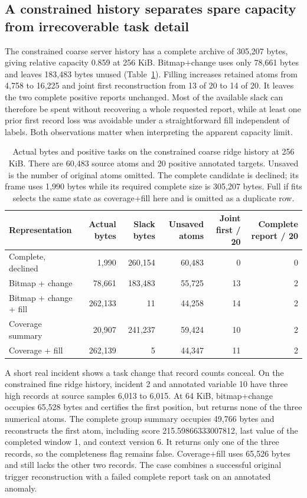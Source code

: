 \documentclass[a4paper,fleqn]{cas-dc}
\begin{document}
\subsection{A constrained history separates spare capacity from irrecoverable task detail}

The constrained coarse server history has a complete archive of 305{,}207 bytes, giving relative capacity 0.859 at 256 KiB. Bitmap+change uses only 78{,}661 bytes and leaves 183{,}483 bytes unused (Table~\ref{tab:3}). Filling increases retained atoms from 4{,}758 to 16{,}225 and joint first reconstruction from 13 of 20 to 14 of 20. It leaves the two complete positive reports unchanged. Most of the available slack can therefore be spent without recovering a whole requested report, while at least one prior first record loss was avoidable under a straightforward fill independent of labels. Both observations matter when interpreting the apparent capacity limit.

\begin{table}
\caption{Actual bytes and positive tasks on the constrained coarse ridge history at 256 KiB. There are 60{,}483 source atoms and 20 positive annotated targets. Unsaved is the number of original atoms omitted. The complete candidate is declined; its frame uses 1{,}990 bytes while its required complete size is 305{,}207 bytes. Full if fits selects the same state as coverage+fill here and is omitted as a duplicate row.}
\label{tab:3}
\small
\begin{tabular*}{\textwidth}{@{\extracolsep{\fill}}lrrrrr@{}}
\toprule
Representation & Actual bytes & Slack bytes & Unsaved atoms & Joint first / 20 & Complete report / 20 \\
\midrule
Complete, declined & 1{,}990 & 260{,}154 & 60{,}483 & 0 & 0 \\
Bitmap + change & 78{,}661 & 183{,}483 & 55{,}725 & 13 & 2 \\
Bitmap + change + fill & 262{,}133 & 11 & 44{,}258 & 14 & 2 \\
Coverage summary & 20{,}907 & 241{,}237 & 59{,}424 & 10 & 2 \\
Coverage + fill & 262{,}139 & 5 & 44{,}347 & 11 & 2 \\
\bottomrule
\end{tabular*}
\end{table}

A short real incident shows a task change that record counts conceal. On the constrained fine ridge history, incident 2 and annotated variable 10 have three high records at source samples 6{,}013 to 6{,}015. At 64 KiB, bitmap+change occupies 65{,}528 bytes and certifies the first position, but returns none of the three numerical atoms. The complete group summary occupies 49{,}766 bytes and reconstructs the first atom, including score 215.59866333007812, last value of the completed window 1, and context version 6. It returns only one of the three records, so the completeness flag remains false. Coverage+fill uses 65{,}526 bytes and still lacks the other two records. The case combines a successful original trigger reconstruction with a failed complete report task on an annotated anomaly.
\end{document}
